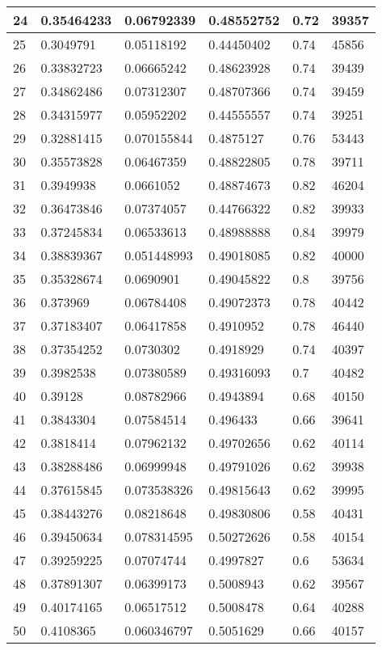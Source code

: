 \begin{longtable}{|l|l|l|l|l|l|}
24 & 0.35464233 & 0.06792339 & 0.48552752 & 0.72 & 39357 \\ \hline 
25 & 0.3049791 & 0.05118192 & 0.44450402 & 0.74 & 45856 \\ \hline 
26 & 0.33832723 & 0.06665242 & 0.48623928 & 0.74 & 39439 \\ \hline 
27 & 0.34862486 & 0.07312307 & 0.48707366 & 0.74 & 39459 \\ \hline 
28 & 0.34315977 & 0.05952202 & 0.44555557 & 0.74 & 39251 \\ \hline 
29 & 0.32881415 & 0.070155844 & 0.4875127 & 0.76 & 53443 \\ \hline 
30 & 0.35573828 & 0.06467359 & 0.48822805 & 0.78 & 39711 \\ \hline 
31 & 0.3949938 & 0.0661052 & 0.48874673 & 0.82 & 46204 \\ \hline 
32 & 0.36473846 & 0.07374057 & 0.44766322 & 0.82 & 39933 \\ \hline 
33 & 0.37245834 & 0.06533613 & 0.48988888 & 0.84 & 39979 \\ \hline 
34 & 0.38839367 & 0.051448993 & 0.49018085 & 0.82 & 40000 \\ \hline 
35 & 0.35328674 & 0.0690901 & 0.49045822 & 0.8 & 39756 \\ \hline 
36 & 0.373969 & 0.06784408 & 0.49072373 & 0.78 & 40442 \\ \hline 
37 & 0.37183407 & 0.06417858 & 0.4910952 & 0.78 & 46440 \\ \hline 
38 & 0.37354252 & 0.0730302 & 0.4918929 & 0.74 & 40397 \\ \hline 
39 & 0.3982538 & 0.07380589 & 0.49316093 & 0.7 & 40482 \\ \hline 
40 & 0.39128 & 0.08782966 & 0.4943894 & 0.68 & 40150 \\ \hline 
41 & 0.3843304 & 0.07584514 & 0.496433 & 0.66 & 39641 \\ \hline 
42 & 0.3818414 & 0.07962132 & 0.49702656 & 0.62 & 40114 \\ \hline 
43 & 0.38288486 & 0.06999948 & 0.49791026 & 0.62 & 39938 \\ \hline 
44 & 0.37615845 & 0.073538326 & 0.49815643 & 0.62 & 39995 \\ \hline 
45 & 0.38443276 & 0.08218648 & 0.49830806 & 0.58 & 40431 \\ \hline 
46 & 0.39450634 & 0.078314595 & 0.50272626 & 0.58 & 40154 \\ \hline 
47 & 0.39259225 & 0.07074744 & 0.4997827 & 0.6 & 53634 \\ \hline 
48 & 0.37891307 & 0.06399173 & 0.5008943 & 0.62 & 39567 \\ \hline 
49 & 0.40174165 & 0.06517512 & 0.5008478 & 0.64 & 40288 \\ \hline 
50 & 0.4108365 & 0.060346797 & 0.5051629 & 0.66 & 40157 \\ \hline 
\end{longtable}